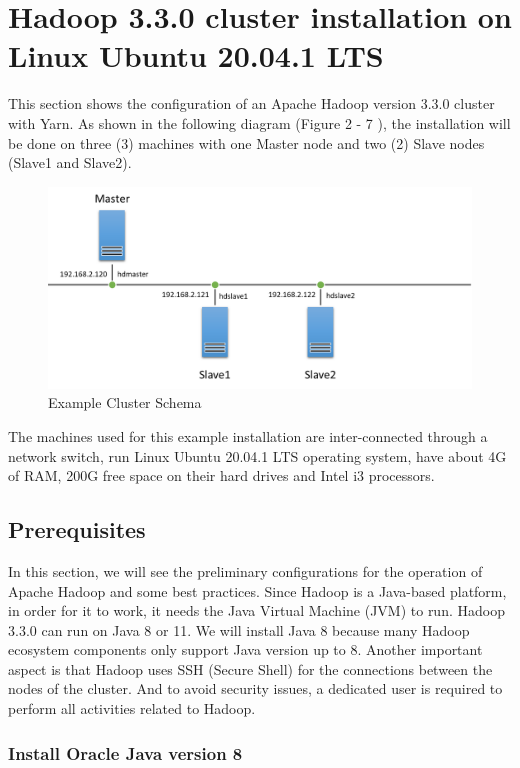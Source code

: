 \documentclass[12pt,english]{book}
\begin{document}
\section{Hadoop 3.3.0 cluster installation on Linux Ubuntu 20.04.1 LTS}


This section shows the configuration of an Apache Hadoop version 3.3.0 cluster with Yarn. As shown in the following diagram (Figure 2 - 7 ), the installation will be done on three (3) machines with one Master node and two (2) Slave nodes (Slave1 and Slave2).


\begin{figure}[ht]
	\centering
	\includegraphics[width=\linewidth]{clusterSchema}
	\caption{Example Cluster Schema}
\end{figure}

The machines used for this example installation are inter-connected through a network switch, run Linux Ubuntu 20.04.1 LTS operating system, have about 4G of RAM, 200G free space on their hard drives and Intel i3 processors.


\subsection{Prerequisites}


In this section, we will see the preliminary configurations for the operation of Apache Hadoop and some best practices.
Since Hadoop is a Java-based platform, in order for it to work, it needs the Java Virtual Machine (JVM) to run.
Hadoop 3.3.0 can run on Java 8 or 11.
We will install Java 8 because many Hadoop ecosystem components only support Java version up to 8. 
Another important aspect is that Hadoop uses SSH (Secure Shell) for the connections between the nodes of the cluster.
And to avoid security issues, a dedicated user is required to perform all activities related to Hadoop.


\subsubsection{Install Oracle Java version 8}
\end{document}
